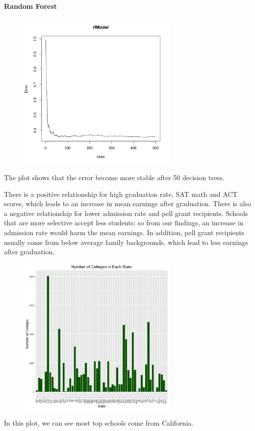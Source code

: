 \documentclass{article}
\begin{document}
\clearpage

\textbf{Random Forest}\newline

\begin{figure}[H]
\includegraphics[width=0.7\textwidth]{../images/rf_top.png}
\end{figure}
The plot shows that the error become more stable after 50 decision trees.


There is a positive relationship for high graduation rate, SAT math and ACT scores, which leads to an increase in mean earnings after graduation.  There is also a negative relationship for lower admission rate and pell grant recipients.  Schools that are more selective accept less students; so from our findings, an increase in admission rate would harm the mean earnings.  In addition, pell grant recipients usually come from below average family backgrounds, which lead to less earnings after graduation. 

\clearpage

\begin{figure}[H]
\includegraphics[width=0.7\textwidth]{../images/college-frequency.png}
\end{figure}
In this plot, we can see most top schools come from California. 
\end{document}
